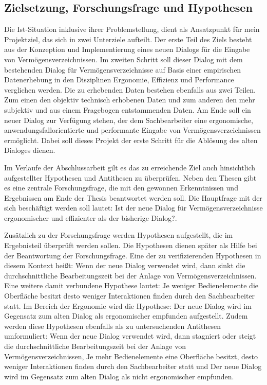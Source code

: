 \subsection{Zielsetzung, Forschungsfrage und Hypothesen}
Die Ist-Situation inklusive ihrer Problemstellung, dient als Ansatzpunkt für mein Projektziel, das sich in zwei Unterziele aufteilt. Der erste Teil des Ziels besteht aus der Konzeption und Implementierung eines neuen Dialogs für die Eingabe von Vermögensverzeichnissen. Im zweiten Schritt soll dieser Dialog mit dem bestehenden Dialog für Vermögensverzeichnisse auf Basis einer empirischen Datenerhebung in den Disziplinen Ergonomie, Effizienz und Performance verglichen werden. Die zu erhebenden Daten bestehen ebenfalls aus zwei Teilen. Zum einen den objektiv technisch erhobenen Daten und zum anderen den mehr subjektiv und aus einem Fragebogen entstammenden Daten. Am Ende soll ein neuer Dialog zur Verfügung stehen, der dem Sachbearbeiter eine ergonomische, anwendungsfallorientierte und performante Eingabe von Vermögensverzeichnissen ermöglicht. Dabei soll dieses Projekt der erste Schritt für die Ablösung des alten Dialoges dienen. 

Im Verlaufe der Abschlussarbeit gilt es das zu erreichende Ziel auch hinsichtlich aufgestellter Hypothesen und Antithesen zu überprüfen. Neben den Thesen gibt es eine zentrale Forschungsfrage, die mit den gewonnen Erkenntnissen und Ergebnissen am Ende der Thesis beantwortet werden soll. Die Hauptfrage mit der sich beschäftigt werden soll lautet: \glqq Ist der neue Dialog für Vermögensverzeichnisse ergonomischer und effizienter als der bisherige Dialog?\grqq{}.

Zusätzlich zu der Forschungsfrage werden Hypothesen aufgestellt, die im Ergebnisteil überprüft werden sollen. Die Hypothesen dienen später als Hilfe bei der Beantwortung der Forschungsfrage. Eine der zu verifizierenden Hypothesen in diesem Kontext heißt: \glqq Wenn der neue Dialog verwendet wird, dann sinkt die durchschnittliche Bearbeitungszeit bei der Anlage von Vermögensverzeichnissen\grqq{}. Eine weitere damit verbundene Hypothese lautet: \glqq Je weniger Bedienelemente die Oberfläche besitzt desto weniger Interaktionen finden durch den Sachbearbeiter statt\grqq{}. Im Bereich der Ergonomie wird die Hypothese: \glqq Der neue Dialog wird im Gegensatz zum alten Dialog als ergonomischer empfunden\grqq{} aufgestellt. Zudem werden diese Hypothesen ebenfalls als zu untersuchenden Antithesen umformuliert: \glqq Wenn der neue Dialog verwendet wird, dann stagniert oder steigt die durchschnittliche Bearbeitungszeit bei der Anlage von Vermögensverzeichnissen\grqq{}, \glqq Je mehr Bedienelemente eine Oberfläche besitzt, desto weniger Interaktionen finden durch den Sachbearbeiter statt\grqq{} und \glqq Der neue Dialog wird im Gegensatz zum alten Dialog als nicht ergonomischer empfunden\grqq{}.

